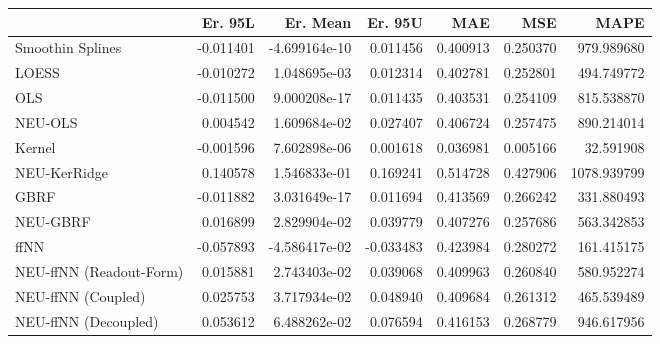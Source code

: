 \begin{tabular}{lrrrrrr}
\toprule
{} &   Er. 95L &      Er. Mean &   Er. 95U &       MAE &       MSE &         MAPE \\
\midrule
Smoothin Splines        & -0.011401 & -4.699164e-10 &  0.011456 &  0.400913 &  0.250370 &   979.989680 \\
LOESS                   & -0.010272 &  1.048695e-03 &  0.012314 &  0.402781 &  0.252801 &   494.749772 \\
OLS                     & -0.011500 &  9.000208e-17 &  0.011435 &  0.403531 &  0.254109 &   815.538870 \\
NEU-OLS                 &  0.004542 &  1.609684e-02 &  0.027407 &  0.406724 &  0.257475 &   890.214014 \\
Kernel                  & -0.001596 &  7.602898e-06 &  0.001618 &  0.036981 &  0.005166 &    32.591908 \\
NEU-KerRidge            &  0.140578 &  1.546833e-01 &  0.169241 &  0.514728 &  0.427906 &  1078.939799 \\
GBRF                    & -0.011882 &  3.031649e-17 &  0.011694 &  0.413569 &  0.266242 &   331.880493 \\
NEU-GBRF                &  0.016899 &  2.829904e-02 &  0.039779 &  0.407276 &  0.257686 &   563.342853 \\
ffNN                    & -0.057893 & -4.586417e-02 & -0.033483 &  0.423984 &  0.280272 &   161.415175 \\
NEU-ffNN (Readout-Form) &  0.015881 &  2.743403e-02 &  0.039068 &  0.409963 &  0.260840 &   580.952274 \\
NEU-ffNN (Coupled)      &  0.025753 &  3.717934e-02 &  0.048940 &  0.409684 &  0.261312 &   465.539489 \\
NEU-ffNN (Decoupled)    &  0.053612 &  6.488262e-02 &  0.076594 &  0.416153 &  0.268779 &   946.617956 \\
\bottomrule
\end{tabular}
